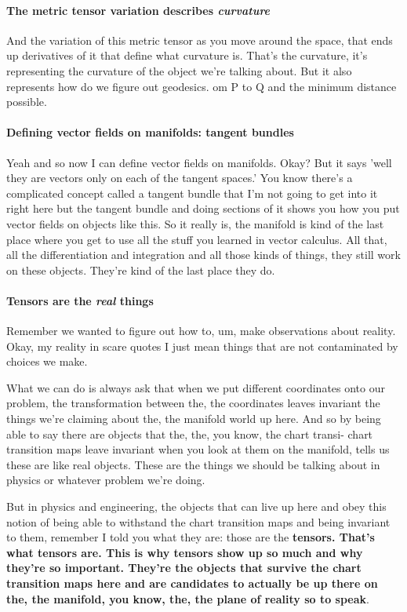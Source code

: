 \paragraph{The metric tensor variation describes \textit{curvature}}
And the variation of this metric tensor as you move around the space, that ends up derivatives of it that define what curvature is. That's the curvature, it's representing the curvature of the object we're talking about. But it also represents how do we figure out geodesics. om P to Q and the minimum distance possible. 
\paragraph{Defining vector fields on manifolds: tangent bundles}
Yeah and so now I can define vector fields on manifolds. Okay? But it says 'well they are vectors only on each of the tangent spaces.' You know there's a complicated concept called a tangent bundle that I'm not going to get into it right here but the tangent bundle and doing sections of it shows you how you put vector fields on objects like this. So it really is, the manifold is kind of the last place where you get to use all the stuff you learned in vector calculus. All that, all the differentiation and integration and all those kinds of things, they still work on these objects. They're kind of the last place they do. 


\paragraph{Tensors are the \textit{real} things}
Remember we wanted to figure out how to, um, make observations about reality. Okay, my reality in scare quotes I just mean things that are not contaminated by choices we make. 

What we can do is always ask that when we put different coordinates onto our problem, the transformation between the, the coordinates leaves invariant the things we're claiming about the, the manifold world up here. And so by being able to say there are objects that the, the, you know, the chart transi- chart transition maps leave invariant when you look at them on the manifold, tells us these are like real objects. These are the things we should be talking about in physics or whatever problem we're doing. 

But in physics and engineering, the objects that can live up here and obey this notion of being able to withstand the chart transition maps and being invariant to them, remember I told you what they are: those are the \textbf{tensors. That's what tensors are. This is why tensors show up so much and why they're so important. They're the objects that survive the chart transition maps here and are candidates to actually be up there on the, the manifold, you know, the, the plane of reality so to speak}. 

